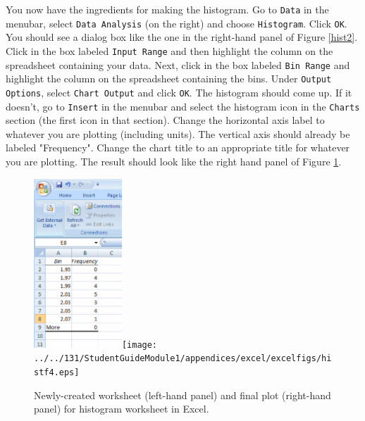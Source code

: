 You now have the ingredients for making the histogram.
Go to {\tt Data} in the menubar, select {\tt Data Analysis} (on the right) and 
choose {\tt Histogram}. Click {\tt OK}.
You should see a dialog box like the one in the right-hand panel of  Figure \ref{hist2}.
Click in the box labeled {\tt Input Range} and then highlight the column on the spreadsheet containing your data.
Next, click in the box labeled {\tt Bin Range} and highlight the column on the spreadsheet containing the bins.
Under {\tt Output Options}, select {\tt Chart Output} and click {\tt OK}. The histogram should come up. 
If it doesn't, go to {\tt Insert} in the menubar and select 
the histogram icon in the {\tt Charts} section (the first icon in that section).
Change the horizontal axis label to whatever you are plotting (including units). The vertical axis should already be labeled "Frequency".
Change the chart title to an appropriate title for whatever you are plotting. 
The result should look like the right hand panel of Figure \ref{hist5}.
\begin{figure}[b!]
\begin{center}
\includegraphics[height=2.5in]{appendices/excel/excelfigs/histf3.eps}\hspace{0.4in}\texttt{[image: ../../131/StudentGuideModule1/appendices/excel/excelfigs/histf4.eps]}
\caption{Newly-created worksheet (left-hand panel) and final plot (right-hand panel) for  histogram worksheet in Excel.}\label{hist5}
\end{center}
\end{figure}

